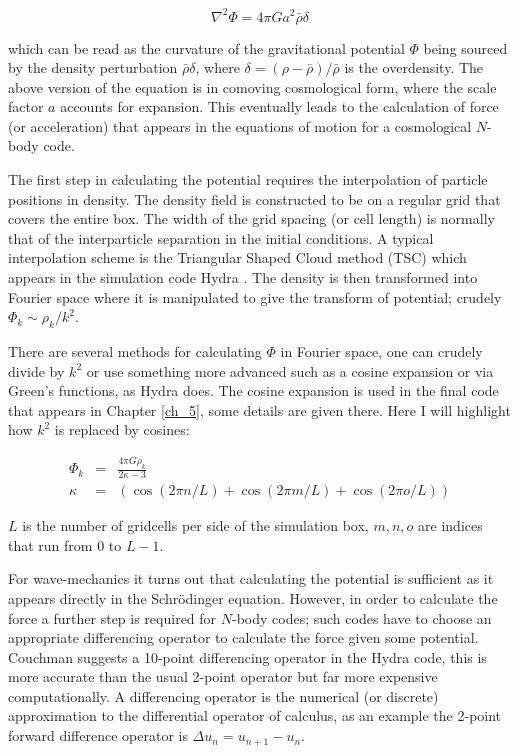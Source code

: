 \begin{equation}
\nabla^2 \Phi = 4\pi G a^2 \bar\rho \delta
\end{equation}

\noindent which can be read as the curvature of the gravitational potential $\Phi$ being sourced by the density perturbation $\bar\rho\delta$, where $\delta = (\rho - \bar\rho)/\bar\rho$ is the overdensity. The above version of the equation is in comoving cosmological form, where the scale factor $a$ accounts for expansion. This eventually leads to the calculation of force (or acceleration) that appears in the equations of motion for a cosmological $N$-body code.

The first step in calculating the potential requires the interpolation of particle positions in density. The density field is constructed to be on a regular grid that covers the entire box. The width of the grid spacing (or cell length) is normally that of the interparticle separation in the initial conditions. A typical interpolation scheme is the Triangular Shaped Cloud method (TSC) which appears in the simulation code Hydra \citep{bib_hmpc1, bib_hmpc}. The density is then transformed into Fourier space where it is manipulated to give the transform of potential; crudely $ \Phi_k \sim \rho_k / k^2$.

There are several methods for calculating $\Phi$ in Fourier space, one can crudely divide by $k^2$ or use something more advanced such as a cosine expansion \citep{bib_nr} or via Green's functions, as Hydra does. The cosine expansion is used in the final code that appears in Chapter \ref{ch_5}, some details are given there. Here I will highlight how $k^2$ is replaced by cosines:

\begin{eqnarray}
 \Phi_k &=&  \frac{4\pi G \rho_k}{ 2 \kappa - 3} \nonumber\\
 \kappa &=& (\cos(2 \pi n/L) + \cos(2 \pi m/L) + \cos(2 \pi o/L))
\end{eqnarray}

\noindent $L$ is the number of gridcells per side of the simulation box, $m,n,o$ are indices that run from 0 to $L -1$.

For wave-mechanics it turns out that calculating the potential is sufficient as it appears directly in the Schr\"odinger equation. However, in order to calculate the force a further step is required for $N$-body codes; such codes have to choose an appropriate differencing operator to calculate the force given some potential. Couchman suggests a 10-point differencing operator in the Hydra code, this is more accurate than the usual 2-point operator but far more expensive computationally. A differencing operator is the numerical (or discrete) approximation to the differential operator of calculus, as an example the 2-point forward difference operator is $\Delta u_n = u_{n+1} - u_n$.

